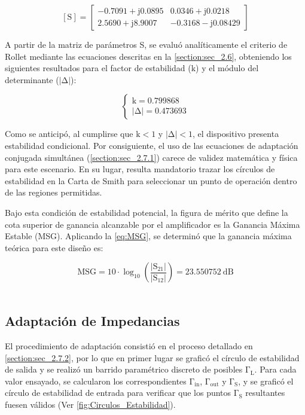 \documentclass{article}
\begin{document}
\begin{equation}
    \mathrm{[S]} = 
    \begin{bmatrix} 
        \mathrm{-0.7091+j0.0895} & \mathrm{0.0346+j0.0218} \\ 
        \mathrm{2.5690+j8.9007} & \mathrm{-0.3168-j0.08429} 
    \end{bmatrix}
    \label{eq:S_params_values}
\end{equation}

A partir de la matriz de parámetros S, se evaluó analíticamente el criterio de Rollet mediante las ecuaciones descritas en la \autoref{section:sec_2.6}, obteniendo los siguientes resultados para el factor de estabilidad ($\mathrm{k}$) y el módulo del determinante ($\mathrm{|\Delta|}$):

\begin{equation}
    \begin{cases}
        \mathrm{k = 0.799868 } \\
        \mathrm{|\Delta| = 0.473693}
    \end{cases}
    \label{eq:k_delta_values}
\end{equation} 

Como se anticipó, al cumplirse que $\mathrm{k < 1}$ y $\mathrm{|\Delta| < 1}$, el dispositivo presenta estabilidad condicional. Por consiguiente, el uso de las ecuaciones de adaptación conjugada simultánea (\autoref{section:sec_2.7.1}) carece de validez matemática y física para este escenario. En su lugar, resulta mandatorio trazar los círculos de estabilidad en la Carta de Smith para seleccionar un punto de operación dentro de las regiones permitidas.

Bajo esta condición de estabilidad potencial, la figura de mérito que define la cota superior de ganancia alcanzable por el amplificador es la Ganancia Máxima Estable (MSG). Aplicando la \autoref{eq:MSG}, se determinó que la ganancia máxima teórica para este diseño es:

\begin{equation}
    \mathrm{MSG = 10 \cdot \log_{10} \left( \frac{|S_{21}|}{|S_{12}|} \right) = 23.550752 \ dB}
\end{equation}
\\



\subsection{Adaptación de Impedancias} \label{section:sec_3.5}
El procedimiento de adaptación consistió en el proceso detallado en \autoref{section:sec_2.7.2}, por lo que en primer lugar se graficó el círculo de estabilidad de salida y se realizó un barrido paramétrico discreto de posibles $\mathrm{\Gamma_L}$. Para cada valor ensayado, se calcularon los correspondientes $\mathrm{\Gamma_{in}}$, $\mathrm{\Gamma_{out}}$ y $\mathrm{\Gamma_S}$, y se graficó el círculo de estabilidad de entrada para verificar que los puntos $\mathrm{\Gamma_S}$ resultantes fuesen válidos (Ver \autoref{fig:Circulos_Estabilidad}).
\end{document}
